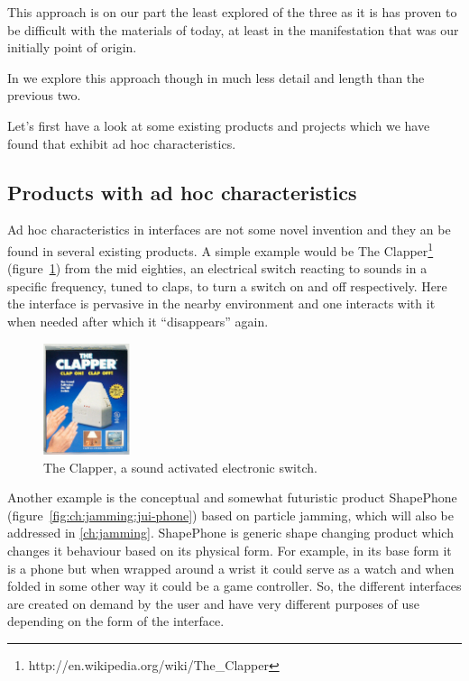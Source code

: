 This approach is on our part the least explored of the three as it is has proven to be difficult with the materials of today, at least in the manifestation that was our initially point of origin. 

In  we explore this approach though in much less detail and length than the previous two.

Let's first have a look at some existing products and projects which we have found that exhibit ad hoc characteristics. 

\subsection{Products with ad hoc characteristics}
Ad hoc characteristics in interfaces are not some novel invention and they an be found in several existing products.
A simple example would be The Clapper\footnote{http://en.wikipedia.org/wiki/The\_Clapper} (figure~\ref{ch:adhoc:theclapper}) from the mid eighties, an electrical switch reacting to sounds in a specific frequency, tuned to claps, to turn a switch on and off respectively.
Here the interface is pervasive in the nearby environment and one interacts with it when needed after which it ``disappears'' again.

\begin{figure}[hb]
	\centering
  		\includegraphics[width=1in]{figures/theclapper}
	\caption[The Clapper, a sound activated electronic switch.]
   {The Clapper, a sound activated electronic switch.}
   \label{ch:adhoc:theclapper}
\end{figure}

Another example is the conceptual and somewhat futuristic product ShapePhone (figure~\ref{fig:ch:jamming:jui-phone}) based on particle jamming, which will also be addressed in \autoref{ch:jamming}.
ShapePhone is generic shape changing product which changes it behaviour based on its physical form.
For example, in its base form it is a phone but when wrapped around a wrist it could serve as a watch and when folded in some other way it could be a game controller.
So, the different interfaces are created on demand by the user and have very different purposes of use depending on the form of the interface.

